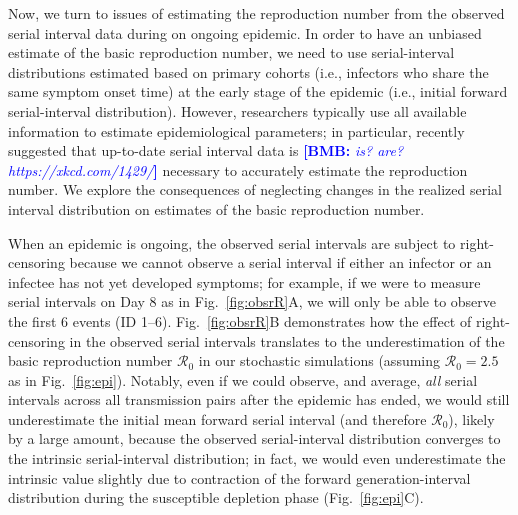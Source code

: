 \documentclass[12pt]{article}
\newcommand{\comment}{\showcomment}
\newcommand{\showcomment}[3]{\textcolor{#1}{\textbf{[#2: }\textsl{#3}\textbf{]}}}
\newcommand{\bmb}[1]{\comment{blue}{BMB}{#1}}
\newcommand{\fref}[1]{Fig.~\ref{fig:#1}}
\newcommand{\Rx}[1]{\ensuremath{{\mathcal R}_{#1}}\xspace}
\newcommand{\Ro}{\Rx{0}}
\begin{document}
Now, we turn to issues of estimating the reproduction number from the observed serial interval data during on ongoing epidemic.
In order to have an unbiased estimate of the basic reproduction number, we need to use serial-interval distributions estimated based on primary cohorts (i.e., infectors who share the same symptom onset time) at the early stage of the epidemic (i.e., initial forward serial-interval distribution).
However, researchers typically use all available information to estimate epidemiological parameters;
in particular, \cite{thompson2019improved} recently suggested that up-to-date serial interval data is \bmb{is? are? https://xkcd.com/1429/} necessary to accurately estimate the reproduction number.
We explore the consequences of neglecting changes in the realized serial interval distribution on estimates of the basic reproduction number.

When an epidemic is ongoing, the observed serial intervals are subject to right-censoring because we cannot observe a serial interval if either an infector or an infectee has not yet developed symptoms;
for example, if we were to measure serial intervals on Day 8 as in \fref{obsrR}A, we will only be able to observe the first 6 events (ID 1--6).
\fref{obsrR}B demonstrates how the effect of right-censoring in the observed serial intervals translates to the underestimation of the basic reproduction number \Ro in our stochastic simulations (assuming $\Ro = 2.5$ as in \fref{epi}).
Notably, even if we could observe, and average, \emph{all} serial intervals across all transmission pairs after the epidemic has ended, we would still underestimate the initial mean forward serial interval (and therefore \Ro), likely by a large amount, because the observed serial-interval distribution converges to the intrinsic serial-interval distribution;
in fact, we would even underestimate the intrinsic value slightly due to contraction of the forward generation-interval distribution during the susceptible depletion phase (\fref{epi}C).
\end{document}
